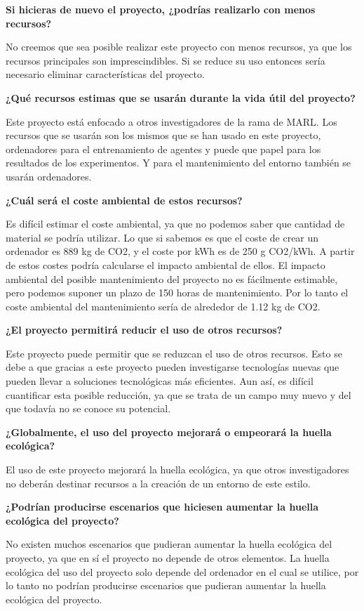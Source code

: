\textbf{Si hicieras de nuevo el proyecto, ¿podrías realizarlo con menos recursos?}

No creemos que sea posible realizar este proyecto con menos recursos, ya que los recursos principales son imprescindibles. Si se reduce su uso entonces sería necesario eliminar características del proyecto.

\textbf{¿Qué recursos estimas que se usarán durante la vida útil del proyecto?}

Este proyecto está enfocado a otros investigadores de la rama de MARL. Los recursos que se usarán son los mismos que se han usado en este proyecto, ordenadores para el entrenamiento de agentes y puede que papel para los resultados de los experimentos. Y para el mantenimiento del entorno también se usarán ordenadores.

\textbf{¿Cuál será el coste ambiental de estos recursos?}

Es difícil estimar el coste ambiental, ya que no podemos saber que cantidad de material se podría utilizar. Lo que si sabemos es que el coste de crear un ordenador es 889 kg de CO2, y el coste por kWh es de 250 g CO2/kWh. A partir de estos costes podría calcularse el impacto ambiental de ellos. El impacto ambiental del posible mantenimiento del proyecto no es fácilmente estimable, pero podemos suponer un plazo de 150 horas de mantenimiento. Por lo tanto el coste ambiental del mantenimiento sería de alrededor de 1.12 kg de CO2.

\textbf{¿El proyecto permitirá reducir el uso de otros recursos?}

Este proyecto puede permitir que se reduzcan el uso de otros recursos. Esto se debe a que gracias a este proyecto pueden investigarse tecnologías nuevas que pueden llevar a soluciones tecnológicas más eficientes. Aun así, es difícil cuantificar esta posible reducción, ya que se trata de un campo muy nuevo y del que todavía no se conoce su potencial.

\textbf{¿Globalmente, el uso del proyecto mejorará o empeorará la huella ecológica?}

El uso de este proyecto mejorará la huella ecológica, ya que otros investigadores no deberán destinar recursos a la creación de un entorno de este estilo.

\textbf{¿Podrían producirse escenarios que hiciesen aumentar la huella ecológica del proyecto?}

No existen muchos escenarios que pudieran aumentar la huella ecológica del proyecto, ya que en sí el proyecto no depende de otros elementos. La huella ecológica del uso del proyecto solo depende del ordenador en el cual se utilice, por lo tanto no podrían producirse escenarios que pudieran aumentar la huella ecológica del proyecto.

